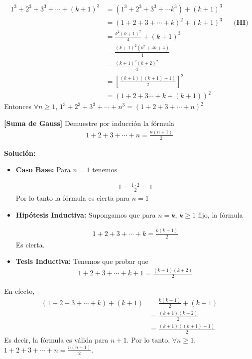 \documentclass[12pt]{book}
\begin{document}
\begin{align*}
     1^3+2^3+3^3+\cdots +(k+1)^3&=  (1^3+2^3+3^3+\cdots k^3) +(k+1)^3 \\
     &= (1+2+3+\cdots+k)^2+(k+1)^3 && \textbf{(HI)} \\
     &= \frac{k^2(k+1)^2}{4}+(k+1)^3 \\
     &=\frac{(k+1)^2(k^2+4k+4)}{4} \\
     &=\frac{(k+1)^2(k+2)^2}{4} \\
     &=\left[\frac{(k+1)((k+1)+1)}{2}\right]^2 \\
     &=(1+2+3\cdots + k +(k+1))^2
\end{align*}
Entonces $\forall n \geq 1$, $ 1^3+2^3+3^3+\cdots+ n^3=(1+2+3+\cdots+n)^2$
\begin{prob}{}{}
\textbf{[Suma de Gauss]} Demuestre por inducción la fórmula 
\begin{align*}
    1+2+3+\cdots + n = \frac{n(n+1)}{2}
\end{align*}
\end{prob}
\textbf{Solución:}
\begin{itemize}
    \item \textbf{Caso Base:} Para $n=1$ tenemos 

    \begin{align*}
        1=\frac{1\cdot2}{2}=1
    \end{align*}
    Por lo tanto la fórmula es cierta para $n=1$

    \item \textbf{Hipótesis Inductiva:} Supongamos que para $n=k$, $k\geq 1$ fijo, la fórmula 

    \begin{align*}
    1+2+3+\cdots + k = \frac{k(k+1)}{2}
    \end{align*}
Es cierta.
    \item \textbf{Tesis Inductiva:} Tenemos que probar que 
    \begin{align*}
        1+2+3+\cdots+ k+1=\frac{(k+1)(k+2)}{2}
    \end{align*}
\end{itemize}
En efecto,
\begin{align*}
         (1+2+3+\cdots+k)+(k+1)&=\frac{k(k+1)}{2}+(k+1) \\
         &=\frac{(k+1)(k+2)}{2} \\
         &=\frac{(k+1)((k+1)+1)}{2}
\end{align*}
Es decir, la fórmula es válida para $n+1$. Por lo tanto, $\forall n \geq 1$, $ 1+2+3+\cdots + n = \frac{n(n+1)}{2}$.
\end{document}
